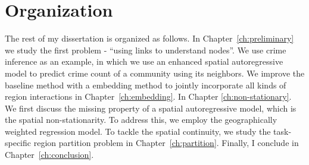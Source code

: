 \section{Organization}


The rest of my dissertation is organized as follows. In Chapter~\ref{ch:preliminary} we study the first problem - ``using links to understand nodes''. We use crime inference as an example, in which we use an enhanced spatial autoregressive model to predict crime count of a community using its neighbors. We improve the baseline method with a embedding method to jointly incorporate all kinds of region interactions in Chapter~\ref{ch:embedding}. In Chapter \ref{ch:non-stationary}. We first discuss the missing property of a spatial autoregressive model, which is the spatial non-stationarity. To address this, we employ the geographically weighted regression model. To tackle the spatial continuity, we study the task-specific region partition problem in Chapter~\ref{ch:partition}. Finally, I conclude in Chapter~\ref{ch:conclusion}.




